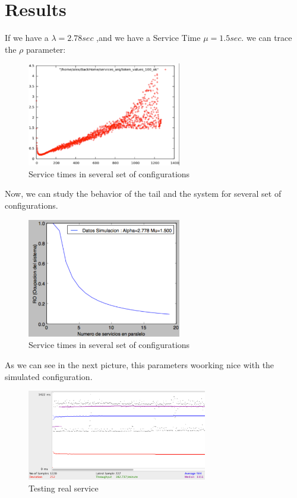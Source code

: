 \documentclass[a4paper,11pt]{article}
\begin{document}
\section{Results}
If we have a $\lambda = 2.78 sec$ ,and we have a Service Time $\mu = 1.5 sec.$ we can trace the $\rho$ parameter:
\begin{figure}[htb]
\begin{center}
\includegraphics[width=0.6\textwidth]{img/time_service.pdf}
\caption{Service times in several set of configurations}
\end{center}
\end{figure}
Now, we can study the behavior of the tail and the system for several set of configurations.


\begin{figure}[htb]
\begin{center}
\includegraphics[width=0.6\textwidth]{img/simulation_1.pdf}
\caption{Service times in several set of configurations}
\end{center}
\end{figure}


As we can see in the next picture, this parameters woorking nice with the simulated configuration.
\newpage
\begin{figure}[htb]
\begin{center}
\includegraphics[width=0.7\textwidth]{img/apache_jmeter.pdf}
\caption{Testing real service}
\end{center}
\end{figure}
\end{document}

